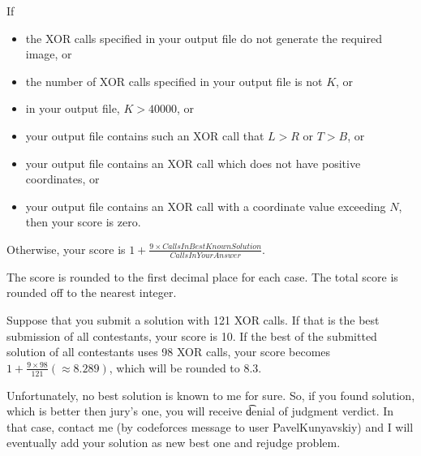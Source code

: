 If
\begin{itemize}
\item the XOR calls specified in your output file do not generate the required image, or
\item the number of XOR calls specified in your output file is not $K$, or
\item in your output file, $K > 40000$, or
\item your output file contains such an XOR call that $L>R$ or $T>B$, or
\item your output file contains an XOR call which does not have positive coordinates, or
\item your output file contains an XOR call with a coordinate value exceeding $N$,
then your score is zero. 
\end{itemize}

Otherwise, your score is
$1+ \frac{9 \times CallsInBestKnownSolution}{CallsInYourAnswer}$.

The score is rounded to the first decimal place for each case. The total score is rounded
off to the nearest integer.

Suppose that you submit a solution with 121 XOR calls. If that is the best submission of
all contestants, your score is 10. If the best of the submitted solution of all contestants
uses 98 XOR calls, your score becomes $1+ \frac{9 \times 98}{121}(\approx 8.289)$, which will be rounded to $8.3$.

Unfortunately, no best solution is known to me for sure. So, if you found solution, which is better then jury's one, you will receive \t{denial of judgment} verdict. In that case, contact me (by codeforces message to user PavelKunyavskiy) and I will eventually add your solution as new best one and rejudge problem. 